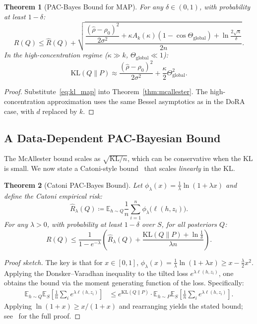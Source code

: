 \documentclass[11pt]{article}
\newtheorem{theorem}{Theorem}[section]
\newcommand{\KL}{\mathrm{KL}}
\newcommand{\Ak}{A_k}
\newcommand{\Rhatl}{\hat{R}_\lambda}
\newcommand{\E}{\mathbb{E}}
\newcommand{\phikl}{\phi_\lambda}
\begin{document}
\begin{theorem}[PAC-Bayes Bound for MAP]
\label{thm:pac_map}
For any $\delta \in (0,1)$, with probability at least $1 - \delta$:
\[
  R(Q) \leq \hat{R}(Q) + \sqrt{
  \frac{\dfrac{(\hat\rho - \rho_0)^2}{2\sigma^2}
    + \kappa \Ak(\kappa)(1 - \cos\Theta_{\mathrm{global}})
    + \ln\frac{2\sqrt{n}}{\delta}}{2n}}.
\]
In the high-concentration regime ($\kappa \gg k$, $\Theta_{\mathrm{global}} \ll 1$):
\[
  \KL(Q \| P) \approx \frac{(\hat\rho - \rho_0)^2}{2\sigma^2}
  + \frac{\kappa}{2}\Theta_{\mathrm{global}}^2.
\]
\end{theorem}

\begin{proof}
Substitute~\eqref{eq:kl_map} into Theorem~\ref{thm:mcallester}.
The high-concentration approximation uses the same Bessel asymptotics
as in the DoRA case, with $d$ replaced by $k$.
\end{proof}

\subsection{A Data-Dependent PAC-Bayesian Bound}
\label{sec:catoni}

The McAllester bound scales as $\sqrt{\KL / n}$, which can be
conservative when the KL is small.
We now state a Catoni-style bound~\cite{catoni2007pac} that scales
\emph{linearly} in the KL.

\begin{theorem}[Catoni PAC-Bayes Bound]
\label{thm:catoni}
Let $\phikl(x) = \tfrac{1}{\lambda}\ln(1 + \lambda x)$ and define
the Catoni empirical risk:
\[
  \Rhatl(Q) \coloneqq \E_{h \sim Q}\frac{1}{n}\sum_{i=1}^n
  \phikl\!\bigl(\ell(h, z_i)\bigr).
\]
For any $\lambda > 0$, with probability at least $1 - \delta$ over $S$,
for all posteriors $Q$:
\[
  R(Q) \leq \frac{1}{1 - e^{-\lambda}}
  \left(\Rhatl(Q) + \frac{\KL(Q\|P) + \ln\frac{1}{\delta}}{\lambda n}\right).
\]
\end{theorem}

\begin{proof}[Proof sketch]
The key is that for $x \in [0,1]$, $\phikl(x) = \tfrac{1}{\lambda}\ln(1+\lambda x)
\geq x - \tfrac{\lambda}{2}x^2$.  Applying the Donsker–Varadhan inequality
to the tilted loss $e^{\lambda \ell(h,z_i)}$, one obtains the bound via
the moment generating function of the loss.
Specifically:
\begin{align*}
  \E_{h\sim Q}\E_S\left[\frac{1}{n}\sum_i e^{\lambda \ell(h,z_i)}\right]
  &\leq e^{\KL(Q\|P)} \cdot
    \E_{h\sim P}\E_S\left[\frac{1}{n}\sum_i e^{\lambda \ell(h,z_i)}\right].
\end{align*}
Applying $\ln(1+x) \geq x/(1+x)$ and rearranging yields the stated bound;
see~\cite{catoni2007pac} for the full proof.

\end{proof}
\end{document}
